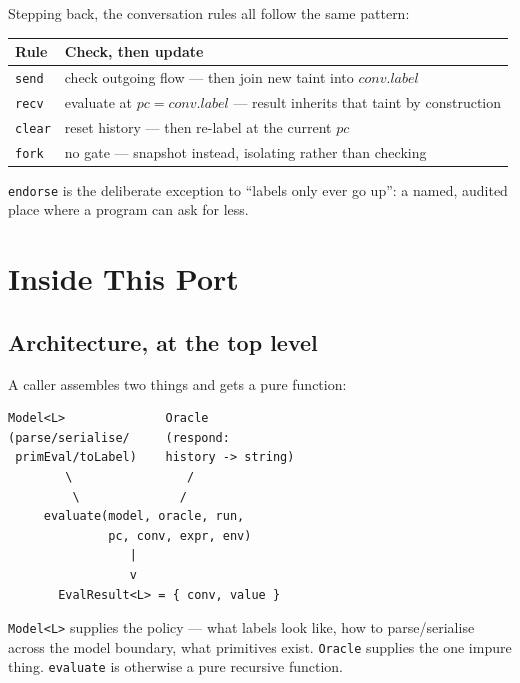 \documentclass[11pt, a4paper]{article}
\begin{document}
Stepping back, the conversation rules all follow the same pattern:

\begin{center}
\begin{tabular}{@{}ll@{}}
\toprule
Rule & Check, then update \\
\midrule
\texttt{send} & check outgoing flow --- then join new taint into $\mathit{conv}.\mathit{label}$ \\
\texttt{recv} & evaluate at $pc = \mathit{conv}.\mathit{label}$ --- result inherits that taint by construction \\
\texttt{clear} & reset history --- then re-label at the current $pc$ \\
\texttt{fork} & no gate --- snapshot instead, isolating rather than checking \\
\bottomrule
\end{tabular}
\end{center}

\lstinline{endorse} is the deliberate exception to ``labels only ever go
up'': a named, audited place where a program can ask for less.

\section{Inside This Port}

\subsection{Architecture, at the top level}

A caller assembles two things and gets a pure function:

\begin{lstlisting}
Model<L>              Oracle
(parse/serialise/     (respond:
 primEval/toLabel)    history -> string)
        \                /
         \              /
     evaluate(model, oracle, run,
              pc, conv, expr, env)
                 |
                 v
       EvalResult<L> = { conv, value }
\end{lstlisting}

\lstinline{Model<L>} supplies the policy --- what labels look like, how to
parse/serialise across the model boundary, what primitives exist.
\lstinline{Oracle} supplies the one impure thing. \lstinline{evaluate} is
otherwise a pure recursive function.
\end{document}
